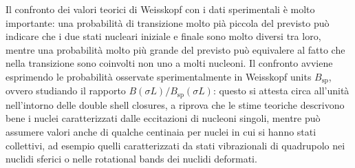 Il confronto dei valori teorici di Weisskopf con i dati sperimentali è molto importante: una probabilità di transizione molto pià piccola del previsto può indicare che i due stati nucleari iniziale e finale sono molto diversi tra loro, mentre una probabilità molto più grande del previsto può equivalere al fatto che nella transizione sono coinvolti non uno a molti nucleoni. Il confronto avviene esprimendo le probabilità osservate sperimentalmente in Weisskopf units $ B_{\text{sp}} $, ovvero studiando il rapporto $ B(\sigma L) / B_{\text{sp}}(\sigma L) $: questo si attesta circa all'unità nell'intorno delle double shell closures, a riprova che le stime teoriche descrivono bene i nuclei caratterizzati dalle eccitazioni di nucleoni singoli, mentre può assumere valori anche di qualche centinaia per nuclei in cui si hanno stati collettivi, ad esempio quelli caratterizzati da stati vibrazionali di quadrupolo nei nuclidi sferici o nelle rotational bands dei nuclidi deformati.










